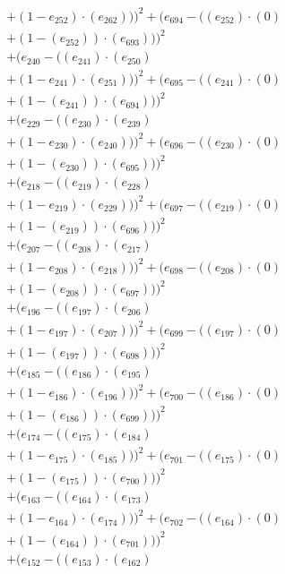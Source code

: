 \documentclass[10pt, a4paper]{article}
\begin{document}
\begin{small}
\begin{align*}
& + (1 - e_{252})  \cdot  (e_{262})))^{2} + (e_{694} - ((e_{252}) \cdot (0) \\
& + (1 - (e_{252})) \cdot (e_{693})))^{2} \\
& + (e_{240} - ((e_{241})  \cdot  (e_{250}) \\
& + (1 - e_{241})  \cdot  (e_{251})))^{2} + (e_{695} - ((e_{241}) \cdot (0) \\
& + (1 - (e_{241})) \cdot (e_{694})))^{2} \\
& + (e_{229} - ((e_{230})  \cdot  (e_{239}) \\
& + (1 - e_{230})  \cdot  (e_{240})))^{2} + (e_{696} - ((e_{230}) \cdot (0) \\
& + (1 - (e_{230})) \cdot (e_{695})))^{2} \\
& + (e_{218} - ((e_{219})  \cdot  (e_{228}) \\
& + (1 - e_{219})  \cdot  (e_{229})))^{2} + (e_{697} - ((e_{219}) \cdot (0) \\
& + (1 - (e_{219})) \cdot (e_{696})))^{2} \\
& + (e_{207} - ((e_{208})  \cdot  (e_{217}) \\
& + (1 - e_{208})  \cdot  (e_{218})))^{2} + (e_{698} - ((e_{208}) \cdot (0) \\
& + (1 - (e_{208})) \cdot (e_{697})))^{2} \\
& + (e_{196} - ((e_{197})  \cdot  (e_{206}) \\
& + (1 - e_{197})  \cdot  (e_{207})))^{2} + (e_{699} - ((e_{197}) \cdot (0) \\
& + (1 - (e_{197})) \cdot (e_{698})))^{2} \\
& + (e_{185} - ((e_{186})  \cdot  (e_{195}) \\
& + (1 - e_{186})  \cdot  (e_{196})))^{2} + (e_{700} - ((e_{186}) \cdot (0) \\
& + (1 - (e_{186})) \cdot (e_{699})))^{2} \\
& + (e_{174} - ((e_{175})  \cdot  (e_{184}) \\
& + (1 - e_{175})  \cdot  (e_{185})))^{2} + (e_{701} - ((e_{175}) \cdot (0) \\
& + (1 - (e_{175})) \cdot (e_{700})))^{2} \\
& + (e_{163} - ((e_{164})  \cdot  (e_{173}) \\
& + (1 - e_{164})  \cdot  (e_{174})))^{2} + (e_{702} - ((e_{164}) \cdot (0) \\
& + (1 - (e_{164})) \cdot (e_{701})))^{2} \\
& + (e_{152} - ((e_{153})  \cdot  (e_{162}) \\

\end{align*}
\end{small}
\end{document}
